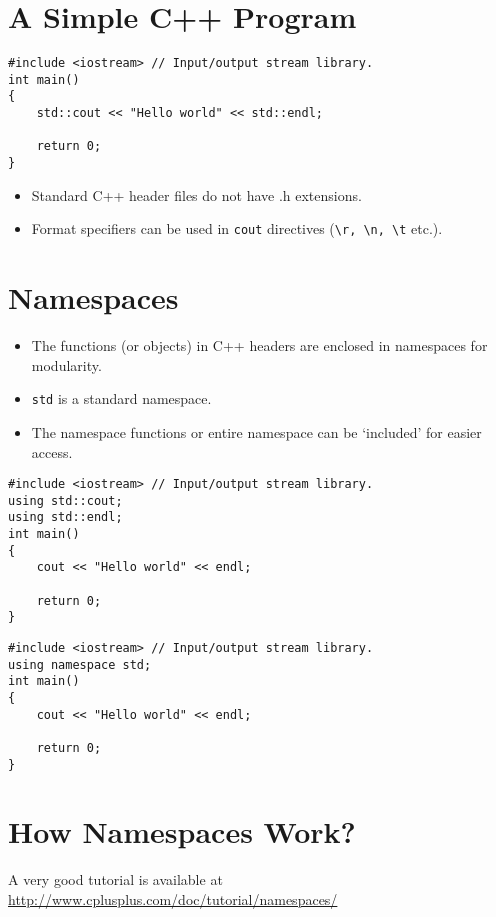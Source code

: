 \documentclass[12pt,a4paper]{article}
\begin{document}
\section{A Simple C++ Program}
\begin{lstlisting}[caption={A Basic C++ Program}]
#include <iostream> // Input/output stream library.
int main()
{
	std::cout << "Hello world" << std::endl;
	
	return 0;
}
\end{lstlisting}
\begin{itemize}
\item Standard C++ header files do not have .h extensions.
\item Format specifiers can be used in \verb|cout| directives (\verb|\r, \n, \t| etc.).
\end{itemize}
\section{Namespaces}
\begin{itemize}
\item The functions (or objects) in C++ headers are enclosed in namespaces for modularity.
\item \texttt{std} is a standard namespace.
\item The namespace functions or entire namespace can be `included' for easier access.
\end{itemize}
\begin{lstlisting}[caption={The `using' Directive}]
#include <iostream> // Input/output stream library.
using std::cout;
using std::endl;
int main()
{
	cout << "Hello world" << endl;
	
	return 0;
}
\end{lstlisting}
\begin{lstlisting}[caption={Including a Namespace}]
#include <iostream> // Input/output stream library.
using namespace std;
int main()
{
	cout << "Hello world" << endl;
	
	return 0;
}
\end{lstlisting}
\section{How Namespaces Work?}
A very good tutorial is available at \url{http://www.cplusplus.com/doc/tutorial/namespaces/}
\end{document}
